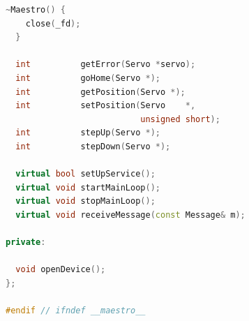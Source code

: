 \documentclass[11pt,a4paper,titlepage]{report}
\begin{document}
\begin{lstlisting}[caption=maestro.h,language=C++]
  ~Maestro() {
    close(_fd);
  }

  int          getError(Servo *servo);
  int          goHome(Servo *);
  int          getPosition(Servo *);
  int          setPosition(Servo    *,
                           unsigned short);
  int          stepUp(Servo *);
  int          stepDown(Servo *);

  virtual bool setUpService();
  virtual void startMainLoop();
  virtual void stopMainLoop();
  virtual void receiveMessage(const Message& m);

private:

  void openDevice();
};

#endif // ifndef __maestro__

\end{lstlisting}
\end{document}
